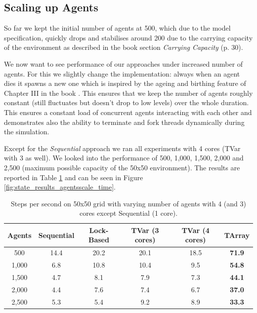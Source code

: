 \subsection{Scaling up Agents}
So far we kept the initial number of agents at 500, which due to the model specification, quickly drops and stabilises around 200 due to the carrying capacity of the environment as described in the book \cite{epstein_growing_1996} section \textit{Carrying Capacity} (p. 30).

We now want to see performance of our approaches under increased number of agents. For this we slightly change the implementation: always when an agent dies it spawns a new one which is inspired by the ageing and birthing feature of Chapter III in the book \cite{epstein_growing_1996}. This ensures that we keep the number of agents roughly constant (still fluctuates but doesn't drop to low levels) over the whole duration. This ensures a constant load of concurrent agents interacting with each other and demonstrates also the ability to terminate and fork threads dynamically during the simulation.

Except for the \textit{Sequential} approach we ran all experiments with 4 cores (TVar with 3 as well). We looked into the performance of 500, 1,000, 1,500, 2,000 and 2,500 (maximum possible capacity of the 50x50 environment). The results are reported in Table \ref{tab:state_results_agentsscale_time} and can be seen in Figure \ref{fig:state_results_agentsscale_time}.

\begin{table}
	\centering
  	\begin{tabular}{ c || c | c | c | c | c }
        Agents  & Sequential & Lock-Based & TVar (3 cores) & TVar (4 cores) & TArray  \\ \hline \hline 
    	500     & 14.4       & 20.2		  &	20.1           & 18.5       	& \textbf{71.9}    \\ \hline
   		1,000   & 6.8        & 10.8 	  & 10.4           & 9.5       	    & \textbf{54.8}    \\ \hline
   		1,500   & 4.7        & 8.1 		  & 7.9            & 7.3			& \textbf{44.1}    \\ \hline
   		2,000   & 4.4        & 7.6 		  & 7.4            & 6.7    		& \textbf{37.0}    \\ \hline 
   		2,500   & 5.3        & 5.4 		  & 9.2            & 8.9			& \textbf{33.3}    \\ \hline \hline
   	\end{tabular}
  	
  	\caption{Steps per second on 50x50 grid with varying number of agents with 4 (and 3) cores except Sequential (1 core).}
	\label{tab:state_results_agentsscale_time}
\end{table}

